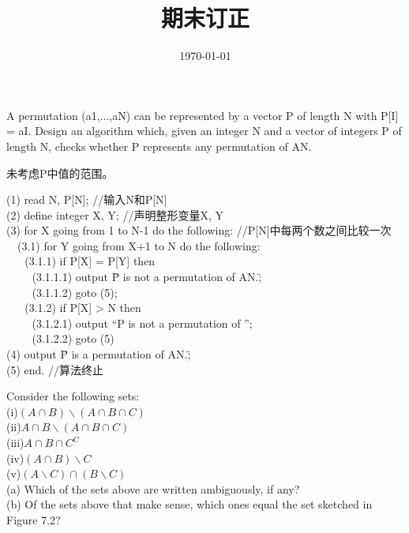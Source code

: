 \documentclass[11pt, a4paper, UTF8]{ctexart}
\title{期末订正}
\date{\today}     %
\begin{document}
\maketitle
\noplagiarism	%

\begincorrection	%

\begin{problem}[DH: 2.10]
    A permutation (a1,...,aN) can be represented by a vector P of length N with P[I] = aI. 
    Design an algorithm which, given an integer N and a vector of integers P of length N, 
    checks whether P represents any permutation of AN.
\end{problem}

\begin{cause}
  未考虑P中值的范围。
\end{cause}

\begin{revision}
    (1) read N, P[N]; //输入N和P[N]\\
    (2) define integer X, Y; //声明整形变量X, Y\\
    (3) for X going from 1 to N-1 do the following: //P[N]中每两个数之间比较一次\\
    $~~~$     (3.1) for Y going from X+1 to N do the following:\\
    $~~~~~~$         (3.1.1) if P[X] = P[Y] then\\
    $~~~~~~~~~$               (3.1.1.1) output \"P is not a permutation of AN.\";\\
    $~~~~~~~~~$               (3.1.1.2) goto (5);\\
    $~~~~~~$         (3.1.2) if P[X] > N then \\
    $~~~~~~~~~$               (3.1.2.1) output “P is not a permutation of ”;\\
    $~~~~~~~~~$               (3.1.2.2) goto (5)\\
      (4) output \"P is a permutation of AN.\";\\
      (5) end. //算法终止
\end{revision}
\begin{problem}[UD: 7.8]
    Consider the following sets:\\
(i)$(A \cap B) \backslash (A \cap B \cap C)$\\
(ii)$A \cap B \backslash (A \cap B \cap C)$\\
(iii)$A \cap B \cap C^{C}$\\
(iv)$(A \cap B) \backslash C$\\
(v)$(A \backslash C) \cap (B \backslash C)$\\
(a) Which of the sets above are written ambiguously, if any?\\
(b) Of the sets above that make sense, which ones equal the set sketched in Figure 7.2?\\
\end{problem}
\end{document}
